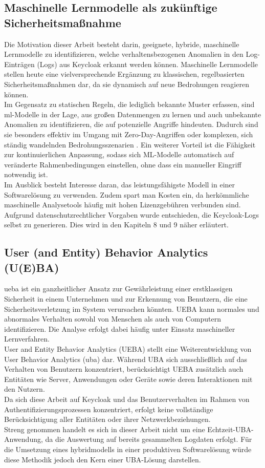 \documentclass[a4paper,12pt]{article}
\begin{document}
	\subsection{Maschinelle Lernmodelle als zukünftige Sicherheitsmaßnahme}
	Die Motivation dieser Arbeit besteht darin, geeignete, hybride, maschinelle Lernmodelle zu identifizieren, welche verhaltensbezogenen Anomalien in den Log-Einträgen (Logs) aus Keycloak erkannt werden können. Maschinelle Lernmodelle stellen heute eine vielversprechende Ergänzung zu klassischen, regelbasierten Sicherheitsmaßnahmen dar, da sie dynamisch auf neue Bedrohungen reagieren können.
	\\[0.5em]
	Im Gegensatz zu statischen Regeln, die lediglich bekannte Muster erfassen, sind \gls{ml}-Modelle in der Lage, aus großen Datenmengen zu lernen und auch unbekannte Anomalien zu identifizieren, die auf potenzielle Angriffe hindeuten. Dadurch sind sie besonders effektiv im Umgang mit Zero-Day-Angriffen oder komplexen, sich ständig wandelnden Bedrohungsszenarien \cite{dahal2025}. Ein weiterer Vorteil ist die Fähigkeit zur kontinuierlichen Anpassung, sodass sich ML-Modelle automatisch auf veränderte Rahmenbedingungen einstellen, ohne dass ein manueller Eingriff notwendig ist.
	\\[0.5em]
	Im Ausblick besteht Interesse daran, das leistungsfähigste Modell in einer Softwarelösung zu verwenden. Zudem spart man Kosten ein, da herkömmliche maschinelle Analysetools häufig mit hohen Lizenzgebühren verbunden sind. Aufgrund datenschutzrechtlicher Vorgaben wurde entschieden, die Keycloak-Logs selbst zu generieren. Dies wird in den Kapiteln 8 und 9 näher erläutert.
	
	\subsection{User (and Entity) Behavior Analytics (U(E)BA)}
	\gls{ueba} ist ein ganzheitlicher Ansatz zur Gewährleistung einer erstklassigen Sicherheit in einem Unternehmen und zur Erkennung von Benutzern, die eine Sicherheitsverletzung im System verursachen könnten. UEBA kann normales und abnormales Verhalten sowohl von Menschen als auch von Computern identifizieren. Die Analyse erfolgt dabei häufig unter Einsatz maschineller Lernverfahren.
	\\[0.5em]
	User and Entity Behavior Analytics (UEBA) stellt eine Weiterentwicklung von User Behavior Analytics (\gls{uba}) dar. Während UBA sich ausschließlich auf das Verhalten von Benutzern konzentriert, berücksichtigt UEBA zusätzlich auch Entitäten wie Server, Anwendungen oder Geräte sowie deren Interaktionen mit den Nutzern.
	\\[0.5em]
	Da sich diese Arbeit auf Keycloak und das Benutzerverhalten im Rahmen von Authentifizierungsprozessen konzentriert, erfolgt keine vollständige Berücksichtigung aller Entitäten oder ihrer Netzwerkbeziehungen.
	\\[0.5em]
	Streng genommen handelt es sich in dieser Arbeit nicht um eine Echtzeit-UBA-Anwendung, da die Auswertung auf bereits gesammelten Logdaten erfolgt. Für die Umsetzung eines \gls{hybridmodell}s in einer produktiven Softwarelösung würde diese Methodik jedoch den Kern einer UBA-Lösung darstellen.
	
\end{document}
